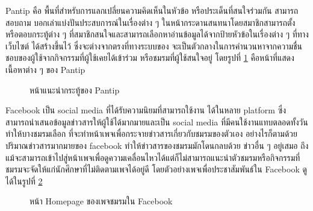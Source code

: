 \documentclass[14pt,oneside,openright,a4paper]{cpe-thai-project}
\begin{document}
Pantip คือ พื้นที่สำหรับการแลกเปลี่ยนความคิดเห็นในหัวข้อ หรือประเด็นที่สนใจร่วมกัน สามารถสอบถาม บอกเล่าแบ่งปันประสบการณ์ในเรื่องต่าง ๆ ในหน้ากระดานสนทนาโดยสมาชิกสามารถตั้ง หรือตอบกระทู้ต่าง ๆ ที่สมาชิกสนใจและสามารถเลือกหาอ่านข้อมูลได้จากป้ายหัวข้อในเรื่องต่าง ๆ ที่ทางเว็บไซต์ ได้สร้างขึ้นไว้ ซึ่งจะต่างจากตรงที่ทางระบบของ จะเป็นตัวกลางในการคำนวนหาจากความชื่นชอบของผู้ใช้จากกิจกรรมที่ผู้ใช้เคยได้เข้าร่วม หรือชมรมที่ผู้ใช้สนใจอยู่ โดยรูปที่ \ref{fig:pantip} คือหน้าที่แสดงเนื้อหาต่าง ๆ ของ Pantip

  \begin{figure}[!h]\centering
    \setlength{\fboxrule}{0.5mm} %
    \setlength{\fboxsep}{0.5cm}
    \caption{หน้าแนะนำกระทู้ของ Pantip}\label{fig:pantip}
    \end{figure}

Facebook เป็น social media ที่ได้รับความนิยมที่สามารถใช้งาน ได้ในหลาย platform ซึ่งสามารถนำเสนอข้อมูลข่าวสารให้ผู้ใช้ได้มากมายและเป็น social media ที่มีคนใช้งานแทบตลอดทั้งวัน ทำให้บางชมรมเลือก
ที่จะทำหน้าเพจเพื่อกระจายข่าวสารเกี่ยวกับชมรมของตัวเอง อย่างไรก็ตามด้วยปริมาณข่าวสารมากมายของ facebook ทำให้ข่าวสารของชมรมมักโดนกลบด้วย  ข่าวอื่น ๆ อยู่เสมอ ถึงแม้จะสามารถเข้าไปสู่หน้าเพจเพื่อดูความเคลื่อนไหวได้แต่ก็ไม่สามารถแนะนำตัวชมรมหรือกิจกรรมที่ชมรมจะจัดให้แก่นักศึกษาที่ไม่ติดตามเพจได้อยู่ดี โดยตัวอย่างเพจเพื่อประชาสัมพันธ์ใน Facebook ดูได้ในรูปที่ \ref{fig:facebook}

  \begin{figure}[!h]\centering
    \setlength{\fboxrule}{0.5mm} %
    \setlength{\fboxsep}{0.5cm}
    \caption{หน้า Homepage ของเพจชมรมใน Facebook}\label{fig:facebook}
    \end{figure}
\end{document}
